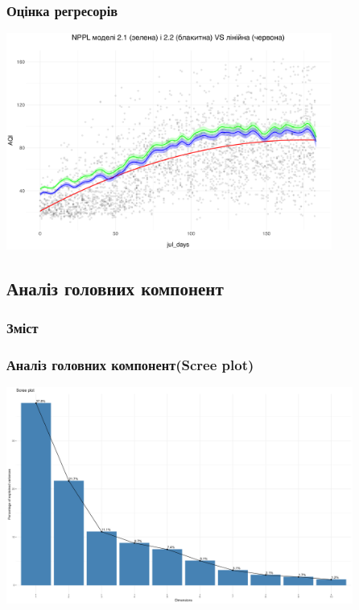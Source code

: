 \documentclass{beamer}
\begin{document}
\begin{frame}
  \frametitle{Оцінка регресорів}

   \begin{center}
    \includegraphics[height=2.8in]{plots/lab4/partial_linear/nppl_vs_lin.png}
  \end{center}
\end{frame}

\begin{frame}
  \section{Аналіз головних компонент}

  \frametitle{Зміст}
  \tableofcontents[currentsection]
\end{frame}

\begin{frame}
\frametitle{Аналіз головних компонент(Scree plot)}
  \includegraphics[height=2.8in]{plots/lab4/pca/scree.png}
\end{frame}
\end{document}
